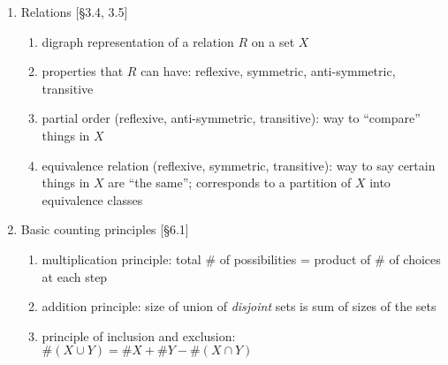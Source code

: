 \documentclass[11pt]{article}
\begin{document}
\begin{enumerate}
\item Relations [\S3.4, 3.5]
\begin{enumerate}
\item digraph representation of a relation $R$ on a set $X$
\item properties that $R$ can have: reflexive, symmetric, anti-symmetric, transitive
\item partial order (reflexive, anti-symmetric, transitive): way to ``compare'' things in $X$
\item equivalence relation (reflexive, symmetric, transitive): way to say certain things in $X$ are ``the same''; corresponds to a partition of $X$ into equivalence classes
\end{enumerate}

\item Basic counting principles [\S6.1]
\begin{enumerate}
\item multiplication principle: total $\#$ of possibilities = product of $\#$ of choices at each step
\item addition principle: size of union of \emph{disjoint} sets is sum of sizes of the sets
\item principle of inclusion and exclusion: $\#(X \cup Y) = \#X + \#Y - \# (X \cap Y)$
\end{enumerate}

\end{enumerate}
\end{document}
